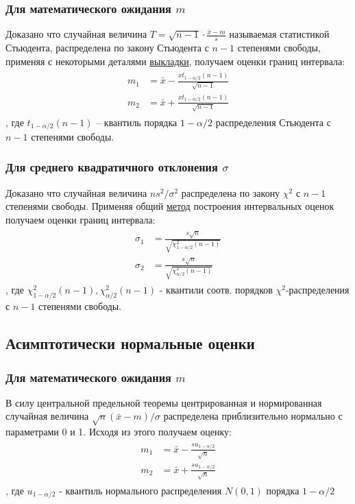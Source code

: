 \documentclass[12pt,a4paper]{article}
\begin{document}
\subsubsection{Для математического ожидания $m$}
Доказано что случайная величина $T = \sqrt{n-1} \cdot \frac{\bar{x} - m}{s}$ называемая статистикой Стьюдента, распределена по закону Стьюдента с $n-1$ степенями свободы, применяя с некоторыми деталями\cite[стр. 457 -- 458]{verrazdely} \hyperref[method]{выкладки}, получаем оценки границ интервала:
\begin{align}\label{lab8:1}
\begin{split}
m_1 &= \bar{x} - \frac{x t_{1 - \alpha / 2} (n-1)}{\sqrt{n-1}} \\
m_2 &= \bar{x} + \frac{x t_{1 - \alpha / 2} (n-1)}{\sqrt{n-1}}
\end{split}
\end{align}
, где $t_{1 - \alpha / 2}(n-1)$ -- квантиль порядка $1 - \alpha / 2$ распределения Стьюдента с $n-1$ степенями свободы.

\subsubsection{Для среднего квадратичного отклонения $\sigma$}
Доказано что случайная величина $n s^2 / \sigma^2$ распределена по закону $\chi^2$ с $n-1$ степенями свободы. Применяя общий \hyperref[method]{метод} построения интервальных оценок получаем оценки границ интервала:
\begin{align}\label{lab8:2}
\begin{split}
\sigma_1 &= \frac{s \sqrt{n}}{\sqrt{\chi_{1-\alpha / 2}^{2}(n-1)}} \\
\sigma_2 &= \frac{s \sqrt{n}}{\sqrt{\chi_{\alpha / 2}^{2}(n-1)}}
\end{split}
\end{align}
, где $\chi_{1 - \alpha / 2}^{2}(n-1), \chi_{\alpha / 2}^{2}(n-1)$ - квантили соотв. порядков $\chi^2$-распределения с $n-1$ степенями свободы.

\subsection{Асимптотически нормальные оценки}
\subsubsection{Для математического ожидания $m$}
В силу центральной предельной теоремы центрированная и нормированная случайная величина $\sqrt{n} (\bar{x} - m) / \sigma$ распределена приблизительно нормально с параметрами 0 и 1. Исходя из этого\cite[стр. 460]{verrazdely} получаем оценку:
\begin{align}\label{lab8:3}
\begin{split}
m_1 &= \bar{x} - \frac{s u_{1 - \alpha / 2}}{\sqrt{n}} \\
m_2 &= \bar{x} + \frac{s u_{1 - \alpha / 2}}{\sqrt{n}}
\end{split}
\end{align}
, где $u_{1 - \alpha /2}$ - квантиль нормального распределения $N(0, 1)$ порядка $1 - \alpha / 2$
\end{document}
